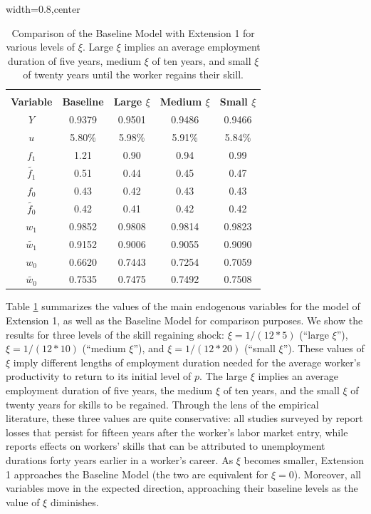 \documentclass[12pt]{article} %
\theoremstyle{definition}
\begin{document}
\begin{table}[h!]
\begin{adjustbox}{width=0.8\columnwidth,center}

 \begin{tabular}{||c c c c c||} 
 \hline
 \\[-1.1em]
 \textbf{Variable} & \textbf{Baseline} & \textbf{Large $\xi$} & \textbf{Medium $\xi$} & \textbf{Small $\xi$}\\  
 \hline\hline
  $Y$  & 0.9379 & 0.9501 & 0.9486 & 0.9466 \\ 
  $u$  & 5.80\% & 5.98\% & 5.91\% & 5.84\%\\ 
  $f_{1}$  & 1.21 & 0.90 & 0.94 & 0.99\\ 
  $\tilde{f_{1}}$  & 0.51 & 0.44 & 0.45 & 0.47\\
  $f_{0}$  &  0.43 & 0.42 & 0.43 & 0.43\\
  $\tilde{f_{0}}$  & 0.42 & 0.41 & 0.42 & 0.42\\
  $w_{1}$  & 0.9852 & 0.9808 & 0.9814 & 0.9823\\
  $\tilde{w_{1}}$ & 0.9152 & 0.9006 & 0.9055 & 0.9090\\
  $w_{0}$  & 0.6620 & 0.7443 & 0.7254 & 0.7059\\
  $\tilde{w_{0}}$ & 0.7535 & 0.7475 & 0.7492 &  0.7508\\ [1ex] 
 \hline
 \end{tabular}
\end{adjustbox}
\centering
     \captionsetup{justification=centering}
\caption{Comparison of the Baseline Model with Extension 1 for various levels of $\xi$. Large $\xi$ implies an average employment duration of five years, medium $\xi$ of ten years, and small $\xi$ of twenty years until the worker regains their skill.} \label{table_ext1}
\end{table} 

Table \ref{table_ext1} summarizes the values of the main endogenous variables for the model of Extension 1, as well as the Baseline Model for comparison purposes.
We show the results for three levels of the skill regaining shock: $\xi = 1/(12*5)$ (``large $\xi$''),  $\xi = 1/(12*10)$ (``medium $\xi$''), and $\xi = 1/(12*20)$ (``small $\xi$'').
These values of $\xi$ imply different lengths of employment duration needed for the average worker's productivity to return to its initial level of $p$.
The large $\xi$ implies an average employment duration of five years, the medium $\xi$ of ten years, and the small $\xi$ of twenty years for skills to be regained.
Through the lens of the empirical literature, these three values are quite conservative: all studies surveyed by \cite{wachter2020persistent} report losses that persist for fifteen years after the worker's labor market entry, while \cite{arellano2022effect} reports effects on workers' skills that can be attributed to unemployment durations forty years earlier in a worker's career.
As $\xi$ becomes smaller, Extension 1 approaches the Baseline Model (the two are equivalent for $\xi = 0$).
Moreover, all variables move in the expected direction, approaching their baseline levels as the value of $\xi$ diminishes.
\end{document}
